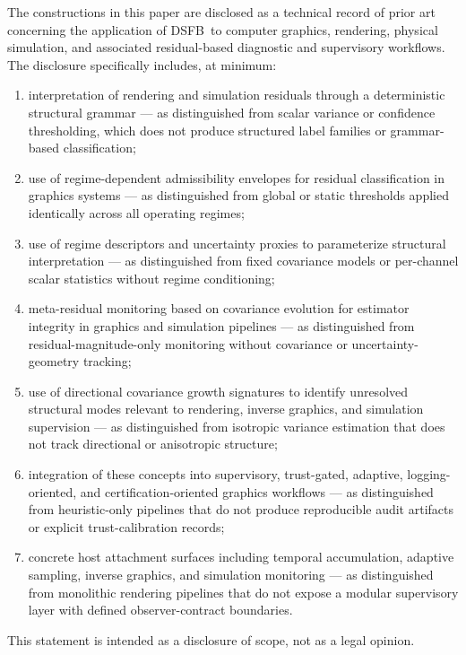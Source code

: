 \documentclass[11pt]{article}
\newcommand{\dsfb}{\textsc{DSFB}}
\theoremstyle{definition}
\theoremstyle{plain}
\begin{document}
The constructions in this paper are disclosed as a technical record of prior art concerning the application of \dsfb\ to computer graphics, rendering, physical simulation, and associated residual-based diagnostic and supervisory workflows. The disclosure specifically includes, at minimum:
\begin{enumerate}[leftmargin=2.2em]
    \item interpretation of rendering and simulation residuals through a deterministic structural grammar --- as distinguished from scalar variance or confidence thresholding, which does not produce structured label families or grammar-based classification;
    \item use of regime-dependent admissibility envelopes for residual classification in graphics systems --- as distinguished from global or static thresholds applied identically across all operating regimes;
    \item use of regime descriptors and uncertainty proxies to parameterize structural interpretation --- as distinguished from fixed covariance models or per-channel scalar statistics without regime conditioning;
    \item meta-residual monitoring based on covariance evolution for estimator integrity in graphics and simulation pipelines --- as distinguished from residual-magnitude-only monitoring without covariance or uncertainty-geometry tracking;
    \item use of directional covariance growth signatures to identify unresolved structural modes relevant to rendering, inverse graphics, and simulation supervision --- as distinguished from isotropic variance estimation that does not track directional or anisotropic structure;
    \item integration of these concepts into supervisory, trust-gated, adaptive, logging-oriented, and certification-oriented graphics workflows --- as distinguished from heuristic-only pipelines that do not produce reproducible audit artifacts or explicit trust-calibration records;
    \item concrete host attachment surfaces including temporal accumulation, adaptive sampling, inverse graphics, and simulation monitoring --- as distinguished from monolithic rendering pipelines that do not expose a modular supervisory layer with defined observer-contract boundaries.
\end{enumerate}
This statement is intended as a disclosure of scope, not as a legal opinion.
\end{document}
